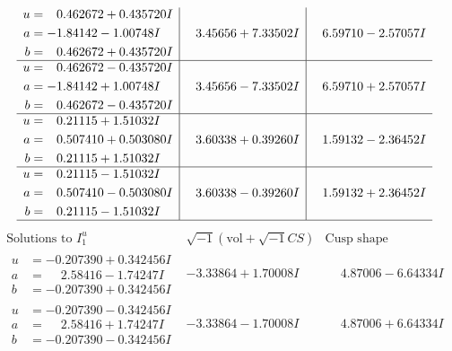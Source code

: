 \documentclass[1p]{elsarticle_modified}
\theoremstyle{definition}
\newcommand{\I}{\sqrt{-1}}
\begin{document}
$$\begin{array}{c|c|c}
\begin{aligned}
u &= \phantom{-}0.462672 + 0.435720 I \\
a &= -1.84142 - 1.00748 I \\
b &= \phantom{-}0.462672 + 0.435720 I\end{aligned}
 & \phantom{-}3.45656 + 7.33502 I & \phantom{-}6.59710 - 2.57057 I \\ \hline\begin{aligned}
u &= \phantom{-}0.462672 - 0.435720 I \\
a &= -1.84142 + 1.00748 I \\
b &= \phantom{-}0.462672 - 0.435720 I\end{aligned}
 & \phantom{-}3.45656 - 7.33502 I & \phantom{-}6.59710 + 2.57057 I \\ \hline\begin{aligned}
u &= \phantom{-}0.21115 + 1.51032 I \\
a &= \phantom{-}0.507410 + 0.503080 I \\
b &= \phantom{-}0.21115 + 1.51032 I\end{aligned}
 & \phantom{-}3.60338 + 0.39260 I & \phantom{-}1.59132 - 2.36452 I \\ \hline\begin{aligned}
u &= \phantom{-}0.21115 - 1.51032 I \\
a &= \phantom{-}0.507410 - 0.503080 I \\
b &= \phantom{-}0.21115 - 1.51032 I\end{aligned}
 & \phantom{-}3.60338 - 0.39260 I & \phantom{-}1.59132 + 2.36452 I\\
 \hline 
 \end{array}$$\newpage$$\begin{array}{c|c|c}  
\text{Solutions to }I^u_{1}& \I (\text{vol} + \sqrt{-1}CS) & \text{Cusp shape}\\
 \hline 
\begin{aligned}
u &= -0.207390 + 0.342456 I \\
a &= \phantom{-}2.58416 - 1.74247 I \\
b &= -0.207390 + 0.342456 I\end{aligned}
 & -3.33864 + 1.70008 I & \phantom{-}4.87006 - 6.64334 I \\ \hline\begin{aligned}
u &= -0.207390 - 0.342456 I \\
a &= \phantom{-}2.58416 + 1.74247 I \\
b &= -0.207390 - 0.342456 I\end{aligned}
 & -3.33864 - 1.70008 I & \phantom{-}4.87006 + 6.64334 I \\ \hline\begin{aligned}

\end{aligned}
\end{array}$$
\end{document}
